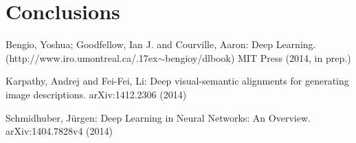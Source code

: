 \documentclass[citeauthoryear]{llncs}
\begin{document}
\section{Conclusions}




%
%
\begin{thebibliography}{}
%
\newcommand{\mytilde}{\raise.17ex\hbox{$\scriptstyle\mathtt{\sim}$}}


Bengio, Yoshua; Goodfellow, Ian J. and Courville, Aaron:
Deep Learning.
(http://www.iro.umontreal.ca/\mytilde{}bengioy/dlbook)
MIT Press (2014, in prep.)







Karpathy, Andrej and Fei-Fei, Li:
Deep visual-semantic alignments for generating image descriptions.
arXiv:1412.2306 (2014)


Schmidhuber, J{\"u}rgen:
Deep Learning in Neural Networks: An Overview.
arXiv:1404.7828v4 (2014)

\end{thebibliography}
\end{document}
